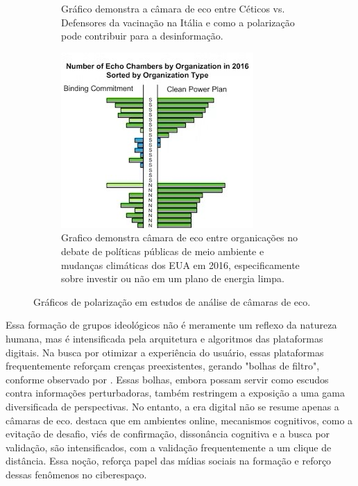 \begin{figure}[htbp]
\begin{subfigure}{0.3\textwidth}
		\caption{Gráfico demonstra a câmara de eco entre Céticos vs. Defensores da vacinação na Itália e como a polarização pode contribuir para a desinformação.}
		\label{fig:echo_chamber_graph_b}
	\end{subfigure}
	\hfill
	\begin{subfigure}{0.3\textwidth}
		\includegraphics[width=\linewidth]{images/echo_chamber_graph_c.jpg}
		\caption{Grafico demonstra câmara de eco entre organicações no debate de políticas públicas de meio ambiente e mudanças climáticas dos EUA em 2016, especificamente sobre investir ou não em um plano de energia limpa.}
		\label{fig:echo_chamber_graph_c}
	\end{subfigure}
	\caption{Gráficos de polarização em estudos de análise de câmaras de eco.}
	\label{fig:echo_chamber_graph}
\end{figure}

Essa formação de grupos ideológicos não é meramente um reflexo da natureza humana, mas é intensificada pela arquitetura e algoritmos das plataformas digitais. Na busca por otimizar a experiência do usuário, essas plataformas frequentemente reforçam crenças preexistentes, gerando "bolhas de filtro", conforme observado por . Essas bolhas, embora possam servir como escudos contra informações perturbadoras, também restringem a exposição a uma gama diversificada de perspectivas. No entanto, a era digital não se resume apenas a câmaras de eco.  destaca que em ambientes online, mecanismos cognitivos, como a evitação de desafio, viés de confirmação, dissonância cognitiva e a busca por validação, são intensificados, com a validação frequentemente a um clique de distância. Essa noção, reforça papel das mídias sociais na formação e reforço dessas fenômenos no ciberespaço.

